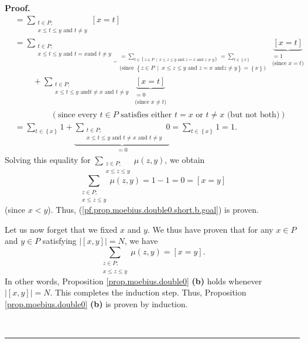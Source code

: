 \documentclass[numbers=enddot,12pt,final,onecolumn,notitlepage]{scrartcl}%
\theoremstyle{definition}
\newenvironment{proof}[1][Proof]{\noindent\textbf{#1.} }{\ \rule{0.5em}{0.5em}}
\newenvironment{vershort}{}{}
\let\sumnonlimits\sum
\renewcommand{\sum}{\sumnonlimits\limits}
\begin{document}
\begin{vershort}
\begin{proof}
\begin{align*}
&  =\sum_{\substack{t\in P;\\x\leq t\leq y\text{ and }t\neq y}}\left[
x=t\right] \\
&  =\underbrace{\sum_{\substack{t\in P;\\x\leq t\leq y\text{ and }t=x\text{
and }t\neq y}}}_{\substack{=\sum_{t\in\left\{  z\in P\ \mid\ x\leq z\leq
y\text{ and }z=x\text{ and }z\neq y\right\}  }=\sum_{t\in\left\{  x\right\}
}\\\text{(since }\left\{  z\in P\ \mid\ x\leq z\leq y\text{ and }z=x\text{ and
}z\neq y\right\}  =\left\{  x\right\}  \text{)}}}\underbrace{\left[
x=t\right]  }_{\substack{=1\\\text{(since }x=t\text{)}}}\\
&  \ \ \ \ \ \ \ \ \ \ +\sum_{\substack{t\in P;\\x\leq t\leq y\text{ and
}t\neq x\text{ and }t\neq y}}\underbrace{\left[  x=t\right]  }%
_{\substack{=0\\\text{(since }x\neq t\text{)}}}\\
&  \ \ \ \ \ \ \ \ \ \ \ \ \ \ \ \ \ \ \ \ \left(  \text{since every }t\in
P\text{ satisfies either }t=x\text{ or }t\neq x\text{ (but not both)}\right)
\\
&  =\sum_{t\in\left\{  x\right\}  }1+\underbrace{\sum_{\substack{t\in
P;\\x\leq t\leq y\text{ and }t\neq x\text{ and }t\neq y}}0}_{=0}=\sum
_{t\in\left\{  x\right\}  }1=1.
\end{align*}
Solving this equality for $\sum_{\substack{z\in P;\\x\leq z\leq y}}\mu\left(
z,y\right)  $, we obtain%
\[
\sum_{\substack{z\in P;\\x\leq z\leq y}}\mu\left(  z,y\right)  =1-1=0=\left[
x=y\right]
\]
(since $x<y$). Thus, (\ref{pf.prop.moebius.double0.short.b.goal}) is proven.

Let us now forget that we fixed $x$ and $y$. We thus have proven that for any
$x\in P$ and $y\in P$ satisfying $\left\vert \left[  x,y\right]  \right\vert
=N$, we have%
\[
\sum_{\substack{z\in P;\\x\leq z\leq y}}\mu\left(  z,y\right)  =\left[
x=y\right]  .
\]
In other words, Proposition \ref{prop.moebius.double0} \textbf{(b)} holds
whenever $\left\vert \left[  x,y\right]  \right\vert =N$. This completes the
induction step. Thus, Proposition \ref{prop.moebius.double0} \textbf{(b)} is
proven by induction.


\end{proof}
\end{vershort}
\end{document}
